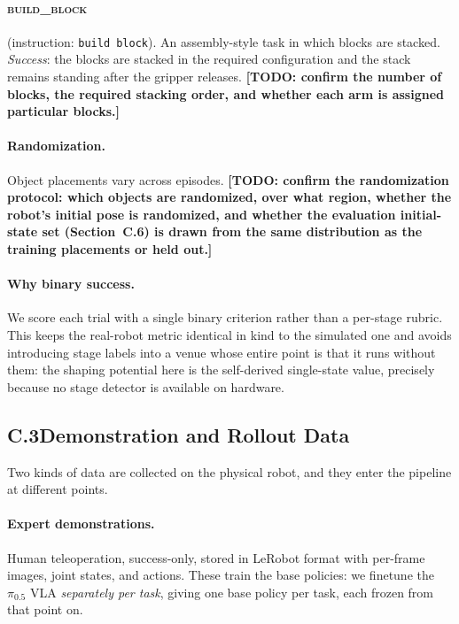 \documentclass[letterpaper]{article} %
\newcommand{\todo}[1]{\textbf{[TODO: #1]}}
\begin{document}
\paragraph{\textsc{build\_block}} (instruction: \texttt{build block}). An
assembly-style task in which blocks are stacked. \emph{Success}: the blocks are
stacked in the required configuration and the stack remains standing after the
gripper releases. \todo{confirm the number of blocks, the required stacking
order, and whether each arm is assigned particular blocks.}

\paragraph{Randomization.}
Object placements vary across episodes. \todo{confirm the randomization protocol:
which objects are randomized, over what region, whether the robot's initial pose
is randomized, and whether the evaluation initial-state set (Section~C.6) is drawn
from the same distribution as the training placements or held out.}

\paragraph{Why binary success.}
We score each trial with a single binary criterion rather than a per-stage
rubric. This keeps the real-robot metric identical in kind to the simulated one
and avoids introducing stage labels into a venue whose entire point is that it
runs without them: the shaping potential here is the self-derived single-state
value, precisely because no stage detector is available on hardware.

\subsection{C.3\quad Demonstration and Rollout Data}

Two kinds of data are collected on the physical robot, and they enter the
pipeline at different points.

\paragraph{Expert demonstrations.}
Human teleoperation, success-only, stored in LeRobot format with per-frame
images, joint states, and actions. These train the base policies: we finetune the
$\pi_{0.5}$ VLA \emph{separately per task}, giving one base policy per task, each
frozen from that point on.
\end{document}
